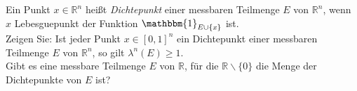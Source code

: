 Ein Punkt $x \in \mathbb{R}^n$ heißt \textit{Dichtepunkt} einer messbaren Teilmenge $E$ von $\mathbb{R}^n$, wenn $x$ Lebesguepunkt der Funktion $\mathbbm{1}_{E\cup\{x\}}$ ist.\\
Zeigen Sie: Ist jeder Punkt $x \in [0,1]^n$ ein Dichtepunkt einer messbaren Teilmenge $E$ von $\mathbb{R}^n$, so gilt $\lambda^n(E) \geq 1$.\\
Gibt es eine messbare Teilmenge $E$ von $\mathbb{R}$, für die $\mathbb{R}\backslash\{0\}$ die Menge der Dichtepunkte von $E$ ist?
